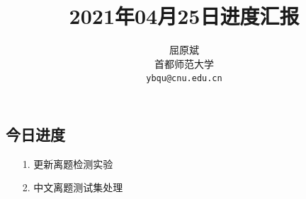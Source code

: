 \documentclass[11pt]{article}
\title{2021年04月25日进度汇报}
\author{屈原斌 \\
  首都师范大学 \\
    {\tt ybqu@cnu.edu.cn}}
\date{}
\begin{document}
\begin{CJK}{UTF8}{gkai}

\maketitle
\CJKindent


\section{今日进度}


\begin{itemize}
  \item [1.] 更新离题检测实验
  \item [2.] 中文离题测试集处理
\end{itemize}


\end{CJK}
\end{document}
